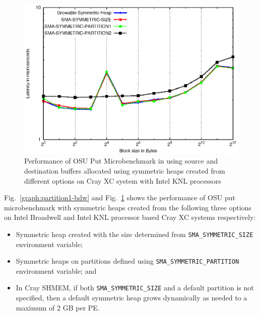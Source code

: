\begin{figure}[ht!]
    \centering
    \includegraphics[width=\linewidth]{graph/partition1-knl.eps}
    \caption{Performance of OSU Put Microbenchmark in using source and
    destination buffers allocated using symmetric heaps created from
    different options
    on Cray XC system with Intel KNL
    processors}
    \label{graph:partition1-knl}
    \vspace{-30pt}
\end{figure}

Fig.~\ref{graph:partition1-bdw} and Fig.~\ref{graph:partition1-knl}
shows the performance of OSU put microbenchmark with symmetric heaps
created from the following three options on Intel Broadwell and Intel
KNL processor based Cray XC systems respectively:
\begin{itemize}
    \item Symmetric heap created with the size determined from
    \texttt{SMA\_SYMMETRIC\_SIZE} environment variable;
    \item Symmetric heaps on partitions defined using
    \texttt{SMA\_SYMMETRIC\_PARTITION} environment variable; and
    \item In Cray SHMEM, if both \texttt{SMA\_SYMMETRIC\_SIZE} and a
    default partition is not specified, then a default symmetric heap
    grows dynamically as needed to a maximum of 2 GB per PE.
\end{itemize}

